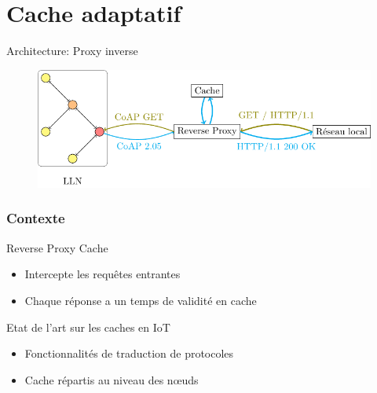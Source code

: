 \section{Cache adaptatif} %
\label{sec:cache_adaptatif}

\begin{frame}{Architecture: Proxy inverse}
  \begin{figure}
    \centering
    \includegraphics[width=\textwidth]{figures/schema_rpc_slides.pdf}
  \end{figure}
\end{frame}

\begin{frame}\frametitle{Contexte}

  \begin{block}{Reverse Proxy Cache}
    \begin{itemize}
      \item Intercepte les requêtes entrantes
      \item Chaque réponse a un temps de validité en cache
    \end{itemize}
  \end{block}

  \begin{block}{Etat de l'art sur les caches en IoT}
    \begin{itemize}
      \item Fonctionnalités de traduction de protocoles
      \item Cache répartis au niveau des nœuds
    \end{itemize}
  \end{block}

\end{frame}

